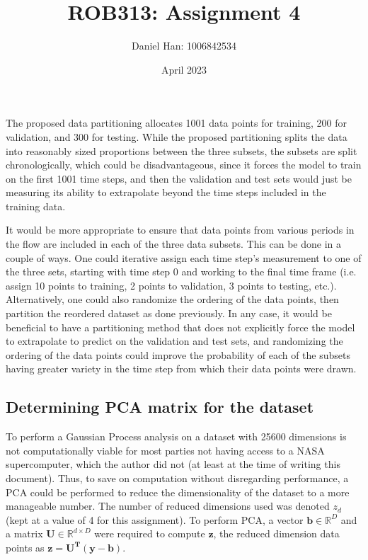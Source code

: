 


\title{ROB313: Assignment 4}
\author{Daniel Han: 1006842534}
\date{April 2023}



\maketitle
\thispagestyle{empty}
\newpage

\tableofcontents \newpage

The proposed data partitioning allocates 1001 data points for training, 200 for validation, and 300 for testing. While the proposed partitioning splits the data into reasonably sized proportions between the three subsets, the subsets are split chronologically, which could be disadvantageous, since it forces the model to train on the first 1001 time steps, and then the validation and test sets would just be measuring its ability to extrapolate beyond the time steps included in the training data.

It would be more appropriate to ensure that data points from various periods in the flow are included in each of the three data subsets. This can be done in a couple of ways. One could iterative assign each time step's measurement to one of the three sets, starting with time step 0 and working to the final time frame (i.e. assign 10 points to training, 2 points to validation, 3 points to testing, etc.). Alternatively, one could also randomize the ordering of the data points, then partition the reordered dataset as done previously. In any case, it would be beneficial to have a partitioning method that does not explicitly force the model to extrapolate to predict on the validation and test sets, and randomizing the ordering of the data points could improve the probability of each of the subsets having greater variety in the time step from which their data points were drawn.

\subsection{Determining PCA matrix for the dataset}
To perform a Gaussian Process analysis on a dataset with 25600 dimensions is not computationally viable for most parties not having access to a NASA supercomputer, which the author did not (at least at the time of writing this document). Thus, to save on computation without disregarding performance, a PCA could be performed to reduce the dimensionality of the dataset to a more manageable number. The number of reduced dimensions used was denoted $z_d$ (kept at a value of 4 for this assignment). To perform PCA, a vector $\mathbf{b} \in \mathbb{R}^{D}$ and a matrix $\mathbf{U} \in \mathbb{R}^{d \times D}$ were required to compute $\mathbf{z}$, the reduced dimension data points as $\mathbf{z} = \mathbf{U^T}(\mathbf{y} - \mathbf{b})$.

